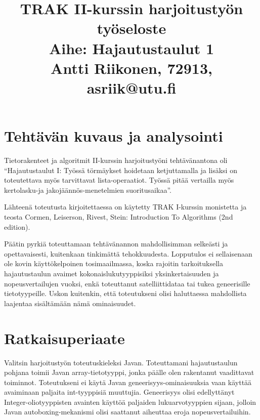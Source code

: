 \documentclass{itlaitos}
\begin{document}
\title{TRAK II-kurssin harjoitustyön työseloste \\ Aihe: Hajautustaulut 1 \\ Antti Riikonen, 72913, asriik@utu.fi}
\maketitle

\tableofcontents 
\newpage

\newpage

\setcounter{page}{1} %
\section{Tehtävän kuvaus ja analysointi}  \pagestyle{fancy}


Tietorakenteet ja algoritmit II-kurssin harjoitustyöni tehtävänantona oli ``Hajautustaulut I: Työssä törmäykset hoidetaan ketjuttamalla ja lisäksi on toteutettava myös tarvittavat lista-operaatiot. Työssä pitää vertailla myös kertolasku-ja jakojäännös-menetelmien suoritusaikaa''.

Lähteenä toteutusta kirjoitettaessa on käytetty TRAK I-kurssin monistetta ja teosta Cormen, Leiserson, Rivest, Stein: Introduction To Algorithms (2nd edition).

Päätin pyrkiä toteuttamaan tehtävänannon mahdollisimman selkeästi ja opettavaisesti, kuitenkaan tinkimättä tehokkuudesta. Lopputulos ei sellaisenaan ole kovin käyttökelpoinen tosimaailmassa, koska rajoitin tarkoituksella hajautustaulun avaimet kokonaislukutyyppisiksi yksinkertaisuuden ja nopeusvertailujen vuoksi, enkä toteuttanut satelliittidataa tai tukea geneerisille tietotyypeille. Uskon kuitenkin, että toteutukseni olisi haluttaessa mahdollista laajentaa sisältämään nämä ominaisuudet.

\section{Ratkaisuperiaate}

Valitsin harjoitustyön toteutuskieleksi Javan. Toteuttamani hajautustaulun pohjana toimii Javan array-tietotyyppi, jonka päälle olen rakentanut vaadittavat toiminnot. Toteutukseni ei käytä Javan geneerisyys-ominaisuuksia vaan käyttää avaiminaan paljaita int-tyyppisiä muuttujia. Geneerisyys olisi edellyttänyt Integer-oliotyyppisten avainten käyttöä paljaiden lukuarvotyyppien sijaan, jolloin Javan autoboxing-mekanismi olisi saattanut aiheuttaa eroja nopeusvertailuihin.
\end{document}
